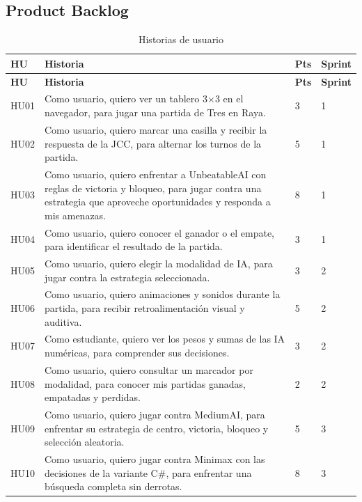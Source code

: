 \documentclass[12pt,a4paper]{article}
\begin{document}
\subsection{Product Backlog}
\begin{longtable}{p{1.1cm}p{8.6cm}p{1.2cm}p{1.6cm}}
\caption{Historias de usuario}\\
\toprule
\textbf{HU} & \textbf{Historia} & \textbf{Pts} & \textbf{Sprint}\\
\midrule\endfirsthead
\toprule
\textbf{HU} & \textbf{Historia} & \textbf{Pts} & \textbf{Sprint}\\
\midrule\endhead
HU01 & Como usuario, quiero ver un tablero 3$\times$3 en el navegador, para jugar una partida de Tres en Raya. & 3 & 1\\
HU02 & Como usuario, quiero marcar una casilla y recibir la respuesta de la JCC, para alternar los turnos de la partida. & 5 & 1\\
HU03 & Como usuario, quiero enfrentar a UnbeatableAI con reglas de victoria y bloqueo, para jugar contra una estrategia que aproveche oportunidades y responda a mis amenazas. & 8 & 1\\
HU04 & Como usuario, quiero conocer el ganador o el empate, para identificar el resultado de la partida. & 3 & 1\\
HU05 & Como usuario, quiero elegir la modalidad de IA, para jugar contra la estrategia seleccionada. & 3 & 2\\
HU06 & Como usuario, quiero animaciones y sonidos durante la partida, para recibir retroalimentación visual y auditiva. & 5 & 2\\
HU07 & Como estudiante, quiero ver los pesos y sumas de las IA numéricas, para comprender sus decisiones. & 3 & 2\\
HU08 & Como usuario, quiero consultar un marcador por modalidad, para conocer mis partidas ganadas, empatadas y perdidas. & 2 & 2\\
HU09 & Como usuario, quiero jugar contra MediumAI, para enfrentar su estrategia de centro, victoria, bloqueo y selección aleatoria. & 5 & 3\\
HU10 & Como usuario, quiero jugar contra Minimax con las decisiones de la variante C\#, para enfrentar una búsqueda completa sin derrotas. & 8 & 3\\
\bottomrule
\end{longtable}
\end{document}
